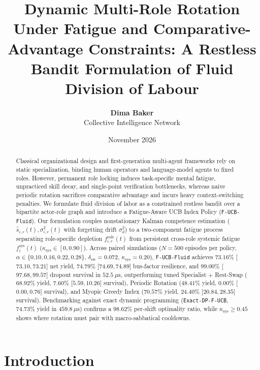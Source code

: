 \documentclass[11pt]{article}
\title{Dynamic Multi-Role Rotation Under Fatigue and Comparative-Advantage Constraints: A Restless Bandit Formulation of Fluid Division of Labour}
\author{\textbf{Dima Baker}\\
Collective Intelligence Network}
\date{November 2026}
\begin{document}
\maketitle

\begin{abstract}
Classical organizational design and first-generation multi-agent frameworks rely on static specialization, binding human operators and language-model agents to fixed roles. However, permanent role locking induces task-specific mental fatigue, unpracticed skill decay, and single-point verification bottlenecks, whereas naive periodic rotation sacrifices comparative advantage and incurs heavy context-switching penalties. We formulate fluid division of labor as a constrained restless bandit over a bipartite actor-role graph and introduce a Fatigue-Aware UCB Index Policy (\texttt{F-UCB-Fluid}). Our formulation couples nonstationary Kalman competence estimation ($\hat{s}_{i,r}(t), \sigma_{i,r}^2(t)$ with forgetting drift $\sigma_d^2$) to a two-component fatigue process separating role-specific depletion $f_{i,r}^{\mathrm{role}}(t)$ from persistent cross-role systemic fatigue $f_i^{\mathrm{sys}}(t)$ ($\kappa_{\mathrm{sys}} \in [0, 0.90]$). Across paired simulations ($N=500$ episodes per policy, $\alpha \in \{0.10, 0.16, 0.22, 0.28\}$, $\delta_{\mathrm{sw}} = 0.072$, $\kappa_{\mathrm{sys}} = 0.20$), \texttt{F-UCB-Fluid} achieves $73.16\%$ [$73.10, 73.21$] net yield, $74.79\%$ [$74.69, 74.89$] bus-factor resilience, and $99.00\%$ [$97.68, 99.57$] dropout survival in $52.5~\mu\mathrm{s}$, outperforming tuned Specialist + Rest-Swap ($68.92\%$ yield, $7.60\%$ [$5.59, 10.26$] survival), Periodic Rotation ($48.41\%$ yield, $0.00\%$ [$0.00, 0.76$] survival), and Myopic Greedy Index ($70.57\%$ yield, $24.40\%$ [$20.84, 28.35$] survival). Benchmarking against exact dynamic programming (\texttt{Exact-DP-F-UCB}, $74.73\%$ yield in $459.8~\mu\mathrm{s}$) confirms a $98.62\%$ per-shift optimality ratio, while $\kappa_{\mathrm{sys}} \ge 0.45$ shows where rotation must pair with macro-sabbatical cooldowns.
\end{abstract}

\section{Introduction}\label{sec:intro}
\end{document}
